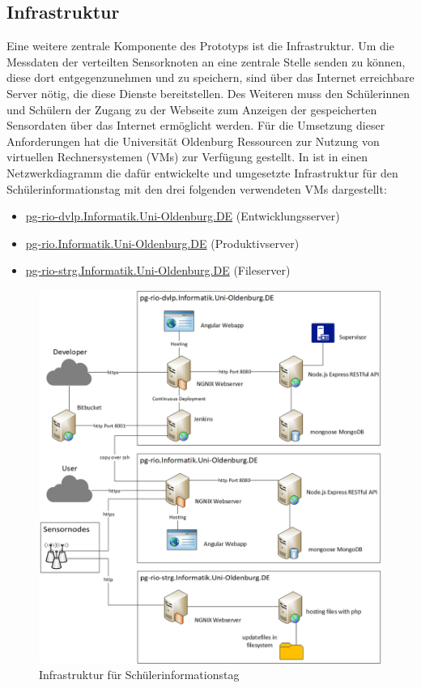 \subsection{Infrastruktur}
Eine weitere zentrale Komponente des Prototyps ist die Infrastruktur.
Um die Messdaten der verteilten Sensorknoten an eine zentrale Stelle senden zu können, diese dort entgegenzunehmen und zu speichern, sind über das Internet erreichbare Server nötig, die diese Dienste bereitstellen.
Des Weiteren muss den Schülerinnen und Schülern der Zugang zu der Webseite zum Anzeigen der gespeicherten Sensordaten über das Internet ermöglicht werden.
Für die Umsetzung dieser Anforderungen hat die Universität Oldenburg Ressourcen zur Nutzung von virtuellen Rechnersystemen (VMs) zur Verfügung gestellt.
In  ist in einen Netzwerkdiagramm die dafür entwickelte und umgesetzte Infrastruktur für den Schülerinformationstag mit den drei folgenden verwendeten VMs dargestellt:
\begin{itemize}
\item \url{pg-rio-dvlp.Informatik.Uni-Oldenburg.DE} (Entwicklungsserver)
\item \url{pg-rio.Informatik.Uni-Oldenburg.DE} (Produktivserver)
\item \url{pg-rio-strg.Informatik.Uni-Oldenburg.DE} (Fileserver)
\end{itemize}
\newpage
\begin{figure}[H]
	\centering
	\includegraphics[width=\textwidth]{./ressourcen/SCHIT-Infrastruktur.jpg}
	\caption{Infrastruktur für Schülerinformationstag}
	\label{fig:schitInfra}
\end{figure}

